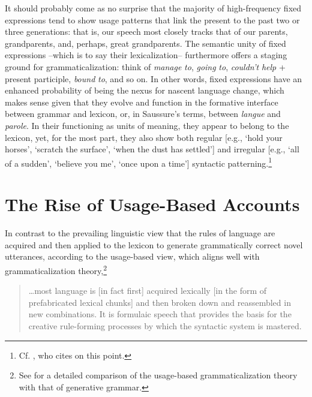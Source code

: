 \documentclass[output=paper]{langsci/langscibook}
\begin{document}
It should probably come as no surprise that the majority of high-frequency fixed expressions tend to show usage patterns that link the present to the past two or three generations: that is, our speech most closely tracks that of our parents, grandparents, and, perhaps, great grandparents. The semantic unity of fixed expressions –which is to say their lexicalization– furthermore offers a staging ground for grammaticalization: think of \textit{manage} \textit{to}, \textit{going} \textit{to}, \textit{couldn’t} \textit{help} + present participle, \textit{bound} \textit{to}, and so on. In other words, fixed expressions have an enhanced probability of being the nexus for nascent language change, which makes sense given that they evolve and function in the formative interface between grammar and lexicon, or, in Saussure’s terms, between \textit{langue} and \textit{parole}. In their functioning as units of meaning, they appear to belong to the lexicon, yet, for the most part, they also show both regular [e.g., ‘hold your horses’, ‘scratch the surface’, ‘when the dust has settled’] and irregular [e.g., ‘all of a sudden’, ‘believe you me’, ‘once upon a time’] syntactic patterning.\footnote{ \textrm{Cf. \citet[2-3]{wood_formulaic_2002}, who cites \citet[36]{richards_two_1983} on this point.}}

\section{The Rise of Usage-Based Accounts}

In contrast to the prevailing linguistic view that the rules of language are acquired and then applied to the lexicon to generate grammatically correct novel utterances, according to the usage-based view, which aligns well with grammaticalization theory,\footnote{ \textrm{See \citet{kibbee_evolution_2010} for a detailed comparison of the usage-based grammaticalization theory with that of generative grammar.}}

\begin{quote}
    …most language is [in fact first] acquired lexically [in the form of prefabricated lexical chunks] and then broken down and reassembled in new combinations. It is formulaic speech that provides the basis for the creative rule-forming processes by which the syntactic system is mastered. \citep[174]{mackenzie_improvisation_2000}
\end{quote}
\end{document}
